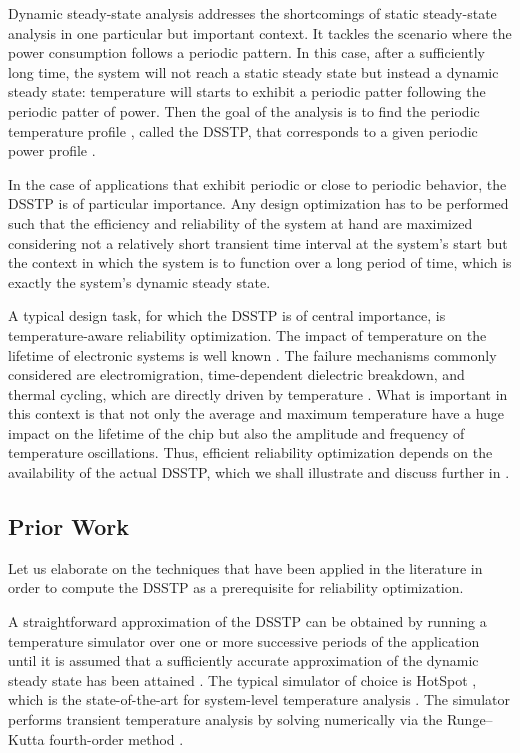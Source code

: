 Dynamic steady-state analysis addresses the shortcomings of static steady-state
analysis in one particular but important context. It tackles the scenario where
the power consumption follows a periodic pattern. In this case, after a
sufficiently long time, the system will not reach a static steady state but
instead a dynamic steady state: temperature will starts to exhibit a periodic
patter following the periodic patter of power. Then the goal of the analysis is
to find the periodic temperature profile \mq, called the \ac{DSSTP}, that
corresponds to a given periodic power profile \mp.

In the case of applications that exhibit periodic or close to periodic behavior,
the \ac{DSSTP} is of particular importance. Any design optimization has to be
performed such that the efficiency and reliability of the system at hand are
maximized considering not a relatively short transient time interval at the
system's start but the context in which the system is to function over a long
period of time, which is exactly the system's dynamic steady state.

A typical design task, for which the \ac{DSSTP} is of central importance, is
temperature-aware reliability optimization. The impact of temperature on the
lifetime of electronic systems is well known \cite{srinivasan2004, coskun2006,
jedec2010, xiang2010}. The failure mechanisms commonly considered are
electromigration, time-dependent dielectric breakdown, and thermal cycling,
which are directly driven by temperature \cite{jedec2010}. What is important in
this context is that not only the average and maximum temperature have a huge
impact on the lifetime of the chip but also the amplitude and frequency of
temperature oscillations. Thus, efficient reliability optimization depends on
the availability of the actual \ac{DSSTP}, which we shall illustrate and discuss
further in .

\subsection{Prior Work}

Let us elaborate on the techniques that have been applied in the literature in
order to compute the \ac{DSSTP} as a prerequisite for reliability optimization.

A straightforward approximation of the \ac{DSSTP} can be obtained by running a
temperature simulator over one or more successive periods of the application
until it is assumed that a sufficiently accurate approximation of the dynamic
steady state has been attained \cite{srinivasan2004}. The typical simulator of
choice is HotSpot \cite{skadron2003}, which is the state-of-the-art for
system-level temperature analysis \cite{srinivasan2004, liao2005, coskun2006,
liu2007, huang2009, xiang2010, thiele2011}. The simulator performs transient
temperature analysis by solving  numerically
via the Runge--Kutta fourth-order method \cite{press2007}.

